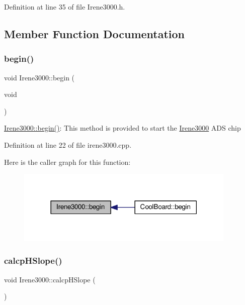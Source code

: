 Definition at line 35 of file Irene3000.\+h.



\subsection{Member Function Documentation}
\mbox{\label{class_irene3000_ad5891806c500ae1007afe52b9e304c2b}} 
\subsubsection{\texorpdfstring{begin()}{begin()}}
{\footnotesize\ttfamily void Irene3000\+::begin (\begin{DoxyParamCaption}\item[{void}]{ }\end{DoxyParamCaption})}

\hyperlink{class_irene3000_ad5891806c500ae1007afe52b9e304c2b}{Irene3000\+::begin()}\+: This method is provided to start the \hyperlink{class_irene3000}{Irene3000} A\+DS chip 

Definition at line 22 of file irene3000.\+cpp.

Here is the caller graph for this function\+:
\nopagebreak
\begin{figure}[H]
\begin{center}
\leavevmode
\includegraphics[width=297pt]{d6/d03/class_irene3000_ad5891806c500ae1007afe52b9e304c2b_icgraph}
\end{center}
\end{figure}
\mbox{\label{class_irene3000_a81f6a79e546679692053f7ac1af49613}} 
\subsubsection{\texorpdfstring{calcp\+H\+Slope()}{calcpHSlope()}}
{\footnotesize\ttfamily void Irene3000\+::calcp\+H\+Slope (\begin{DoxyParamCaption}{ }\end{DoxyParamCaption})}

